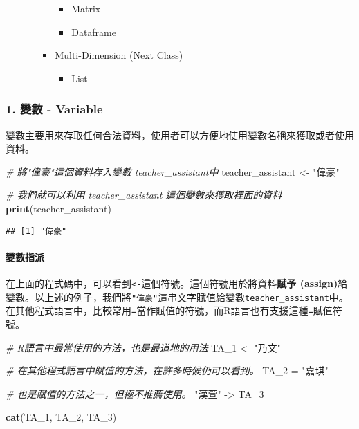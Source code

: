 \documentclass[]{article}
\newenvironment{Shaded}{\begin{snugshade}}{\end{snugshade}}
\newcommand{\KeywordTok}[1]{\textcolor[rgb]{0.13,0.29,0.53}{\textbf{{#1}}}}
\newcommand{\StringTok}[1]{\textcolor[rgb]{0.31,0.60,0.02}{{#1}}}
\newcommand{\CommentTok}[1]{\textcolor[rgb]{0.56,0.35,0.01}{\textit{{#1}}}}
\newcommand{\NormalTok}[1]{{#1}}
\providecommand{\tightlist}{%
  \setlength{\itemsep}{0pt}\setlength{\parskip}{0pt}}
\let\oldparagraph\paragraph
\renewcommand{\paragraph}[1]{\oldparagraph{#1}\mbox{}}
\begin{document}
\begin{enumerate}
\begin{itemize}
\begin{itemize}
      \begin{itemize}
      \tightlist
      \item
        Matrix
      \item
        Dataframe
      \end{itemize}
    \item
      Multi-Dimension (Next Class)

      \begin{itemize}
      \tightlist
      \item
        List
      \end{itemize}
    \end{itemize}
  \end{itemize}
\end{enumerate}

\subsubsection{1. 變數 - Variable}\label{---variable}

變數主要用來存取任何合法資料，使用者可以方便地使用變數名稱來獲取或者使用資料。

\begin{Shaded}
\begin{Highlighting}[]
\CommentTok{# 將"偉豪"這個資料存入變數 teacher_assistant中}
\NormalTok{teacher_assistant <-}\StringTok{ "偉豪"}

\CommentTok{# 我們就可以利用 teacher_assistant 這個變數來獲取裡面的資料}
\KeywordTok{print}\NormalTok{(teacher_assistant)}
\end{Highlighting}
\end{Shaded}

\begin{verbatim}
## [1] "偉豪"
\end{verbatim}

\paragraph{變數指派}

在上面的程式碼中，可以看到\texttt{\textless{}-}這個符號。這個符號用於將資料\textbf{賦予
(assign)}給變數。以上述的例子，我們將\texttt{"偉豪"}這串文字賦值給變數\texttt{teacher\_assistant}中。在其他程式語言中，比較常用\texttt{=}當作賦值的符號，而R語言也有支援這種\texttt{=}賦值符號。

\begin{Shaded}
\begin{Highlighting}[]
\CommentTok{# R語言中最常使用的方法，也是最道地的用法}
\NormalTok{TA_1 <-}\StringTok{ "乃文"}

\CommentTok{# 在其他程式語言中賦值的方法，在許多時候仍可以看到。}
\NormalTok{TA_2 =}\StringTok{ "嘉琪"}

\CommentTok{# 也是賦值的方法之一，但極不推薦使用。}
\StringTok{"漢萱"} \NormalTok{->}\StringTok{ }\NormalTok{TA_3}

\KeywordTok{cat}\NormalTok{(TA_1, TA_2, TA_3)}
\end{Highlighting}
\end{Shaded}
\end{document}
